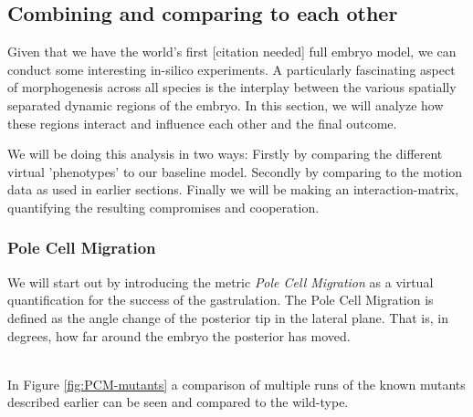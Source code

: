 


\subsection{Combining and comparing to each other}


Given that we have the world’s first [citation needed] full embryo model, we can conduct some interesting in-silico experiments. A particularly fascinating aspect of morphogenesis across all species is the interplay between the various spatially separated dynamic regions of the embryo. In this section, we will analyze how these regions interact and influence each other and the final outcome.

We will be doing this analysis in two ways: Firstly by comparing the different virtual 'phenotypes' to our baseline model. Secondly by comparing to the motion data as used in earlier sections. Finally we will be making an interaction-matrix, quantifying the resulting compromises and cooperation.  
\subsubsection{Pole Cell Migration}
We will start out by introducing the metric \textit{Pole Cell Migration} as a virtual quantification for the success of the gastrulation. The Pole Cell Migration is defined as the angle change of the posterior tip in the lateral plane. That is, in degrees, how far around the embryo the posterior has moved.



\\In Figure \ref{fig:PCM-mutants} a comparison of multiple runs of the known mutants described earlier can be seen and compared to the wild-type.

